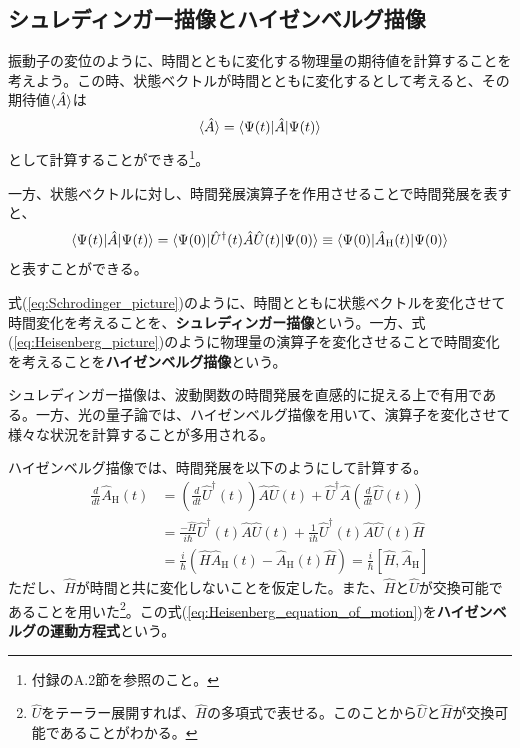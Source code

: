 \subsection{シュレディンガー描像とハイゼンベルグ描像}
振動子の変位のように、時間とともに変化する物理量の期待値を計算することを考えよう。この時、状態ベクトルが時間とともに変化するとして考えると、その期待値$\braket{\hat A}$は
\begin{equation}
  \braket{\hat A} = \braket{\Psi(t)|\hat A | \Psi(t)}
  \label{eq:Schrodinger_picture}
\end{equation}
として計算することができる\footnote{付録のA.2節を参照のこと。}。

一方、状態ベクトルに対し、時間発展演算子を作用させることで時間発展を表すと、
\begin{equation}
  \braket{\Psi(t)|\hat A|\Psi(t)} = \braket{\Psi(0)|\hat U^\dagger(t) \hat A \hat U(t) | \Psi(0)} \equiv \braket{\Psi(0) | \hat A_\mathrm H(t) | \Psi(0)}
  	\label{eq:Heisenberg_picture}
\end{equation}
と表すことができる。

式(\ref{eq:Schrodinger_picture})のように、時間とともに状態ベクトルを変化させて時間変化を考えることを、\textbf{シュレディンガー描像}という。一方、式(\ref{eq:Heisenberg_picture})のように物理量の演算子を変化させることで時間変化を考えることを\textbf{ハイゼンベルグ描像}という。

シュレディンガー描像は、波動関数の時間発展を直感的に捉える上で有用である。一方、光の量子論では、ハイゼンベルグ描像を用いて、演算子を変化させて様々な状況を計算することが多用される。

ハイゼンベルグ描像では、時間発展を以下のようにして計算する。
\begin{equation}
\begin{aligned}
  \frac{d}{dt}\hat A_\mathrm H (t) &= \left( \frac d {dt} \hat U^\dagger (t)\right) \hat A \hat U(t) + \hat U^\dagger \hat A \left( \frac{d}{dt}\hat U(t) \right)\\
	&= \frac{-\hat H}{i\hbar} \hat U^\dagger (t)\hat A\hat U(t) + \frac{1}{i\hbar}\hat U^\dagger(t) \hat A \hat U(t) \hat H\\
	&= \frac{i}{\hbar}\left( \hat H \hat A_\mathrm H(t) - \hat A_\mathrm H(t) \hat H \right) = \frac{i}{\hbar}\left[ \hat H, \hat A_\mathrm H \right]
\label{eq:Heisenberg_equation_of_motion}
\end{aligned}
\end{equation}
ただし、$\hat H$が時間と共に変化しないことを仮定した。また、$\hat H$と$\hat U$が交換可能であることを用いた\footnote{$\hat U$をテーラー展開すれば、$\hat H$の多項式で表せる。このことから$\hat U$と$\hat H$が交換可能であることがわかる。}。この式(\ref{eq:Heisenberg_equation_of_motion})を\textbf{ハイゼンベルグの運動方程式}という。

